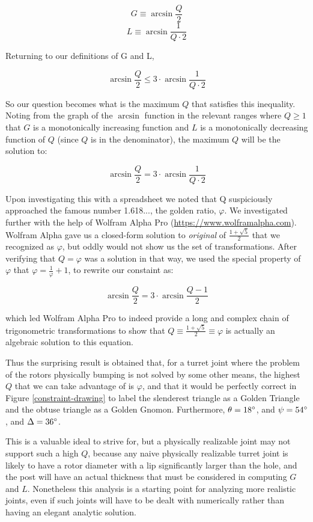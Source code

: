 \documentclass[11pt]{article}
\begin{document}
\[
G \equiv \arcsin{\frac{Q}{2}}
\]
\[
L \equiv \arcsin{\frac{1}{Q \cdot 2}}
\]

Returning to our definitions of G and L,

\[ \arcsin{\frac{Q}{2}} \leq 3 \cdot \arcsin{\frac{1}{Q \cdot 2}} \]

So our question becomes what is the maximum $Q$ that satisfies this inequality. Noting from the graph of the $\arcsin$ function in
the relevant ranges where $Q \geq 1$ that $G$ is a monotonically increasing function and $L$ is a
monotonically decreasing function of $Q$ (since $Q$ is in the denominator), the maximum $Q$ will be the solution to:

\[\tag{original}  \arcsin{\frac{Q}{2}} = 3 \cdot \arcsin{\frac{1}{Q \cdot 2}} \]

Upon investigating this with a spreadsheet we noted that Q suspiciously approached the famous number 1.618..., the golden ratio, $\varphi$.
We investigated further with the help of Wolfram Alpha Pro
(\href{https://www.wolframalpha.com}{https://www.wolframalpha.com}).
Wolfram Alpha gave us a closed-form solution to \emph{original} of $\frac{1 + \sqrt{5}}{2}$
that we recognized as $\varphi$, but oddly would
not show us the set of transformations. After verifying that $Q = \varphi$ was
a solution in that way, we used the special property of
$\varphi$ that $ \varphi = \frac{1}{\varphi} + 1 $, to rewrite our constaint as:

\[\tag{assuming $Q=\varphi$} \arcsin{\frac{Q}{2}} = 3 \cdot \arcsin{\frac{Q - 1}{2}} \]

which led Wolfram Alpha Pro to indeed provide a long and complex chain of trigonometric transformations to show that
$Q \equiv \frac{1 + \sqrt{5}}{2} \equiv \varphi$ is actually an algebraic solution to
this equation.

Thus the surprising result is obtained that, for a turret joint where the problem of the rotors physically bumping is not
solved by some other means, the highest $Q$ that we can take advantage of is $\varphi$, and that it would be
perfectly correct in Figure \ref{constraint-drawing} to label the slenderest triangle as a Golden Triangle and the obtuse
triangle as a Golden Gnomon. Furthermore, $\theta = 18\degree$, and $\psi = 54\degree$, and $\Delta = 36\degree$.

This is a valuable ideal to strive for, but a physically realizable joint may not support such a high $Q$,
because any naive physically realizable
turret joint is likely to have a rotor diameter with a lip significantly larger than the hole, and the post will have an actual
thickness that must be considered in computing $G$ and $L$. Nonetheless this analysis is a starting point for analyzing more
realistic joints, even if such joints will have to be dealt with numerically rather than having an elegant analytic solution.
\end{document}
